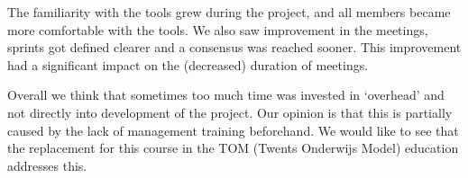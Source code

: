 The familiarity with the tools grew during the project, and all members became more comfortable with the tools. We also saw improvement in the meetings, sprints got defined clearer and a consensus was reached sooner. This improvement had a significant impact on the (decreased) duration of meetings.

Overall we think that sometimes too much time was invested in `overhead' and not directly into development of the project. Our opinion is that this is partially caused by the lack of management training beforehand. We would like to see that the replacement for this course in the TOM (Twents Onderwijs Model) education addresses this.


